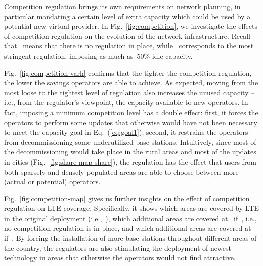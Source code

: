 \documentclass[10pt,journal,cspaper,compsoc]{IEEEtran}
\newcommand{\Fig}[1]{Fig.~\ref{fig:#1}}
\newcommand{\Eq}[1]{Eq.~(\ref{eq:#1})}
\begin{document}
Competition regulation brings its own requirements on network planning, in particular mandating a certain level
of extra capacity which could be used by a potential new virtual provider.
In \Fig{competition}, we investigate the effects of competition regulation on the evolution of the network infrastructure.
Recall that~ means that there is no regulation in place, while~ corresponds to the most stringent regulation, imposing as much as~50\% idle capacity.

\Fig{competition-varh} confirms that the tighter the competition regulation,
the lower the savings operators are able to achieve.
As expected, moving from the most loose to the tightest level of regulation
also increases the unused capacity -- i.e., from the regulator's viewpoint, the capacity
available to new operators.
In fact, imposing a minimum competition level has a double effect:
first, it forces the operators to perform 
some updates that otherwise would have not been necessary to meet the capacity goal in \Eq{goal1};
second, it restrains the operators from decommissioning some underutilized base stations.
Intuitively, since most of the decommissioning would take place in the rural areas and most of the updates
in cities (\Fig{share-map-share}), the regulation has the effect that
users from both sparsely and densely populated areas
are able to choose between more (actual or potential) operators.

\begin{figure*}[t]
\centering
{}
\caption{
Unused capacity and cost (as defined in \Eq{goal3})
as a function of HHI index and for different values of~ (a);
LTE coverage at~ (orange),~ when~ (light green),
and at~ when~ (dark green).
\label{fig:competition}
}
\end{figure*}

\Fig{competition-map} gives us further insights on the effect of
competition regulation on LTE coverage.
Specifically, it shows which areas are covered by LTE in the original deployment (i.e.,~),
which additional areas are covered at~ if~, i.e., no competition regulation
is in place, and which additional areas are covered at~ if~.
By forcing the installation of more base stations throughout
different areas of the country,
the regulators are also stimulating the deployment of newest technology in areas that otherwise
the operators would not find attractive.
\end{document}
